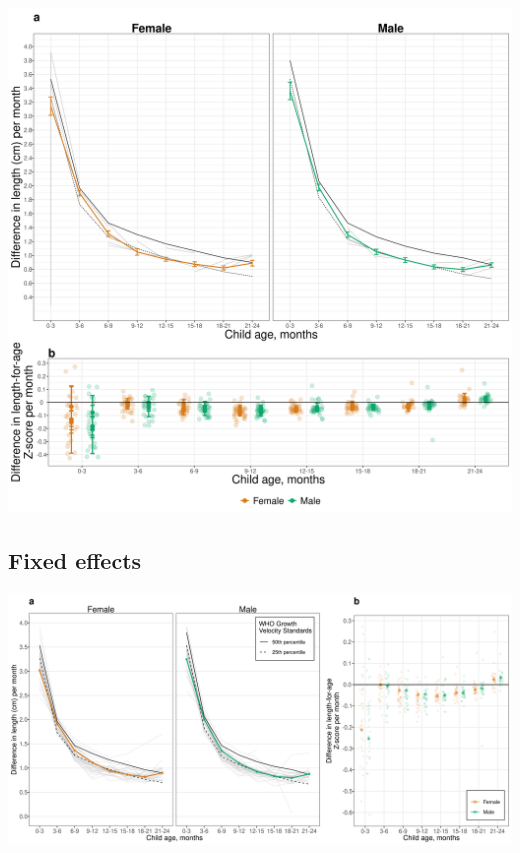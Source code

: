 \documentclass[
  9pt,
]{book}
\begin{document}
\includegraphics[width=50in]{figures//stunting/fig-stunt-2-vel-overall--allage-primary}

\hypertarget{fixed-effects-4}{%
\subsection{Fixed effects}\label{fixed-effects-4}}

\includegraphics[width=50in]{figures//stunting/fig-stunt-2-vel-overall--allage-fe}

  
\end{document}

